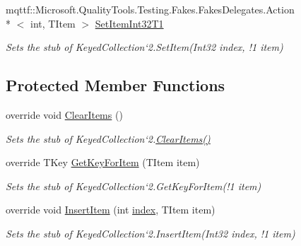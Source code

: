 \begin{DoxyCompactItemize}
mqttf\-::\-Microsoft.\-Quality\-Tools.\-Testing.\-Fakes.\-Fakes\-Delegates.\-Action\\*
$<$ int, T\-Item $>$ \hyperlink{class_system_1_1_collections_1_1_object_model_1_1_fakes_1_1_stub_keyed_collection_3_01_t_key_00_01_t_item_01_4_ad19d1cd16818aeafacb9b762a511b675}{Set\-Item\-Int32\-T1}
\begin{DoxyCompactList}\small\item\em Sets the stub of Keyed\-Collection`2.Set\-Item(Int32 index, !1 item)\end{DoxyCompactList}\end{DoxyCompactItemize}
\subsection*{Protected Member Functions}
\begin{DoxyCompactItemize}
\item 
override void \hyperlink{class_system_1_1_collections_1_1_object_model_1_1_fakes_1_1_stub_keyed_collection_3_01_t_key_00_01_t_item_01_4_a72c488aa9e4423358251d529a0650f77}{Clear\-Items} ()
\begin{DoxyCompactList}\small\item\em Sets the stub of Keyed\-Collection`2.\hyperlink{class_system_1_1_collections_1_1_object_model_1_1_fakes_1_1_stub_keyed_collection_3_01_t_key_00_01_t_item_01_4_a72c488aa9e4423358251d529a0650f77}{Clear\-Items()}\end{DoxyCompactList}\item 
override T\-Key \hyperlink{class_system_1_1_collections_1_1_object_model_1_1_fakes_1_1_stub_keyed_collection_3_01_t_key_00_01_t_item_01_4_ac4ea9ac6d8741bd1414ca10ad7105e4f}{Get\-Key\-For\-Item} (T\-Item item)
\begin{DoxyCompactList}\small\item\em Sets the stub of Keyed\-Collection`2.Get\-Key\-For\-Item(!1 item)\end{DoxyCompactList}\item 
override void \hyperlink{class_system_1_1_collections_1_1_object_model_1_1_fakes_1_1_stub_keyed_collection_3_01_t_key_00_01_t_item_01_4_a7ce8808ee7b3226ac7948d1b8ed12208}{Insert\-Item} (int \hyperlink{jquery-1_810_82-vsdoc_8js_a75bb12d1f23302a9eea93a6d89d0193e}{index}, T\-Item item)
\begin{DoxyCompactList}\small\item\em Sets the stub of Keyed\-Collection`2.Insert\-Item(Int32 index, !1 item)\end{DoxyCompactList}\item 

\end{DoxyCompactItemize}
